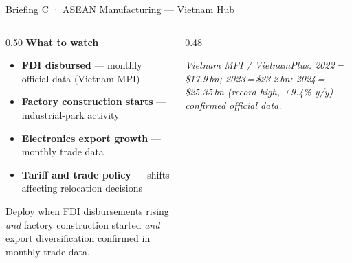 \documentclass[aspectratio=169,10pt]{beamer}
\newcommand{\src}[1]{{\vspace{1pt}\par\raggedright\tiny\color{steel}\itshape #1}}
\newcommand{\er}{{\textcolor{navy}{\rule{16pt}{2.5pt}}}\enspace}
\begin{document}
\begin{frame}{Briefing C · ASEAN Manufacturing — Vietnam Hub}
\begin{columns}[T,totalwidth=\textwidth]

\begin{column}{0.50\textwidth}
{\scriptsize\bfseries\color{navy}What to watch}\\[4pt]
{\footnotesize\begin{itemize}\setlength\itemsep{3pt}
  \item \textbf{FDI disbursed} — monthly official data (Vietnam MPI)
  \item \textbf{Factory construction starts} — industrial-park activity
  \item \textbf{Electronics export growth} — monthly trade data
  \item \textbf{Tariff and trade policy} — shifts affecting relocation decisions
\end{itemize}}
\vspace{6pt}
\begin{block}{\small Deploy when}
{\footnotesize FDI disbursements rising \textit{and} factory construction started
\textit{and} export diversification confirmed in monthly trade data.}
\end{block}
\end{column}

\begin{column}{0.48\textwidth}
\src{Vietnam MPI / VietnamPlus. 2022\,=\,\$17.9\,bn; 2023\,=\,\$23.2\,bn; 2024\,=\,\$25.35\,bn (record high, +9.4\% y/y) — confirmed official data.}
\end{column}

\end{columns}
\end{frame}
\end{document}

